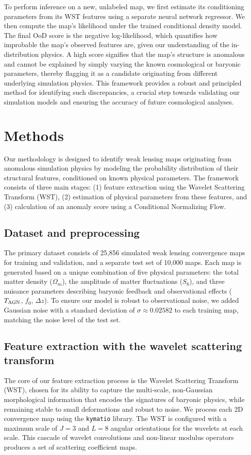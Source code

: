 \documentclass[]{article}
\begin{document}
To perform inference on a new, unlabeled map, we first estimate its conditioning parameters from its WST features using a separate neural network regressor. We then compute the map's likelihood under the trained conditional density model. The final OoD score is the negative log-likelihood, which quantifies how improbable the map's observed features are, given our understanding of the in-distribution physics. A high score signifies that the map's structure is anomalous and cannot be explained by simply varying the known cosmological or baryonic parameters, thereby flagging it as a candidate originating from different underlying simulation physics. This framework provides a robust and principled method for identifying such discrepancies, a crucial step towards validating our simulation models and ensuring the accuracy of future cosmological analyses.

\section{Methods}
\label{sec:methods}
Our methodology is designed to identify weak lensing maps originating from anomalous simulation physics by modeling the probability distribution of their structural features, conditioned on known physical parameters. The framework consists of three main stages: (1) feature extraction using the Wavelet Scattering Transform (WST), (2) estimation of physical parameters from these features, and (3) calculation of an anomaly score using a Conditional Normalizing Flow.

\subsection{Dataset and preprocessing}
The primary dataset consists of 25,856 simulated weak lensing convergence maps for training and validation, and a separate test set of 10,000 maps. Each map is generated based on a unique combination of five physical parameters: the total matter density ($\Omega_m$), the amplitude of matter fluctuations ($S_8$), and three nuisance parameters describing baryonic feedback and observational effects ($T_{\rm AGN}$, $f_0$, $\Delta z$). To ensure our model is robust to observational noise, we added Gaussian noise with a standard deviation of $\sigma \approx 0.02582$ to each training map, matching the noise level of the test set.

\subsection{Feature extraction with the wavelet scattering transform}
The core of our feature extraction process is the Wavelet Scattering Transform (WST), chosen for its ability to capture the multi-scale, non-Gaussian morphological information that encodes the signatures of baryonic physics, while remaining stable to small deformations and robust to noise. We process each 2D convergence map using the \texttt{kymatio} library. The WST is configured with a maximum scale of $J=3$ and $L=8$ angular orientations for the wavelets at each scale. This cascade of wavelet convolutions and non-linear modulus operators produces a set of scattering coefficient maps.
\end{document}
